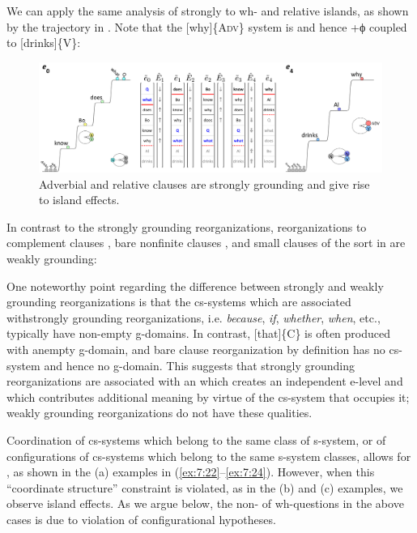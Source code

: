   We can apply the same analysis of strongly  to wh- and relative islands, as shown by the trajectory in {}. Note that the [why]\{A\textsc{dv}\} system is  and hence +ϕ coupled to [drinks]\{V\}:

  
\begin{figure}
\includegraphics[width=\textwidth]{figures/Tilsen-img164.png}
\caption{Adverbial and relative clauses are strongly grounding and give rise to island effects.}
\label{fig:7:20}
\end{figure}
 

  In contrast to the strongly grounding reorganizations, reorganizations to complement clauses , bare nonfinite clauses , and small clauses of the sort in  are weakly grounding:

\ea\label{ex:7:21}
\label{ex:7:21a}
\label{ex:7:21b}
\label{ex:7:21c}
\z
\z

  One noteworthy point regarding the difference between strongly and weakly grounding reorganizations is that the cs-systems which are associated with\linebreak strongly grounding reorganizations, i.e. \textit{because}, \textit{if}, \textit{whether}, \textit{when}, etc., typically have non-empty g-domains. In contrast, [that]\{C\} is often produced with an\linebreak empty g-domain, and bare clause reorganization by definition has no cs-system and hence no g-domain. This suggests that strongly grounding reorganizations are associated with an  which creates an independent e-level and which contributes additional meaning by virtue of the cs-system that occupies it; weakly grounding reorganizations do not have these qualities.

  Coordination of cs-systems which belong to the same class of s-system, or of configurations of cs-systems which belong to the same s-system classes, allows for , as shown in the (a) examples in (\ref{ex:7:22}--\ref{ex:7:24}). However, when this “coordinate structure” constraint is violated, as in the (b) and (c) examples, we observe island effects. As we argue below, the non- of wh-questions in the above cases is due to violation of configurational hypotheses.


